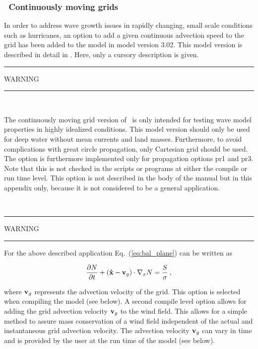 \vsssub
\subsubsection{~Continuously moving grids} \label{sub:num_move}


\vspace{\baselineskip} 
\noindent
In order to address wave growth issues in rapidly changing, small scale
conditions such as hurricanes, an option to add a given continuous advection
speed to the grid has been added to the model in model version 3.02. This
model version is described in detail in \cite{tol:OMOD05b}. Here, only a
cursory description is given.

\begin{center}
\rule[1mm]{55mm}{1.0mm} WARNING \rule[1mm]{55mm}{1.0mm} \\
 \vspace{\baselineskip}
\parbox{120mm}{The continuously moving grid version of \ws\ is only intended 
for testing wave model properties in highly idealized conditions. This model
version should only be used for deep water without mean currents and land
masses. Furthermore, to avoid complications with great circle propagation,
only Cartesian grid should be used. The option is furthermore implemented only
for propagation options {\F pr1} and {\F pr3}. Note that this is not checked
in the scripts or programs at either the compile or run time level.  This
option is not described in the body of the manual but in this appendix only,
because it is not considered to be a general application.} \\
\vspace{\baselineskip}
\rule[1mm]{55mm}{1.0mm} WARNING \rule[1mm]{55mm}{1.0mm}
\end{center}

\noindent
For the above described application Eq.~(\ref{eq:bal_plane}) can be written as

\begin{equation}
\frac{\partial N}{\partial t} + 
\left ( {\bf\dot{x}}-{\bf{v}}_g \right ) \cdot \nabla_x N  = 
\frac{S}{\sigma} \: , \label{eq:bal_move}
\end{equation}

\noindent
where ${\bf{v}}_g$ represents the advection velocity of the grid. This option
is selected when compiling the model (see below). A second compile level
option allows for adding the grid advection velocity ${\bf{v}}_g$ to the wind
field. This allows for a simple method to assure mass conservation of a wind
field independent of the actual and instantaneous grid advection velocity. The
advection velocity ${\bf{v}}_g$ can vary in time and is provided by the user
at the run time of the model (see below).

